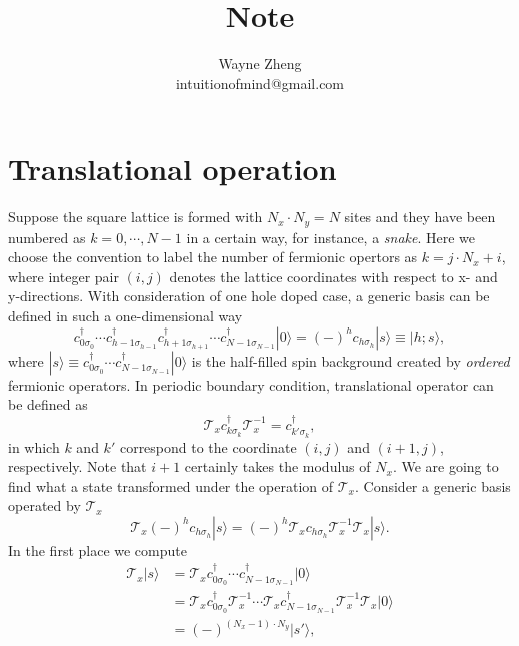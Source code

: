 \documentclass[eprint]{article} %
\begin{document}
\title{Note}
\author{Wayne Zheng \\
intuitionofmind@gmail.com}

\maketitle

\section{Translational operation}
Suppose the square lattice is formed with $N_{x}\cdot{N}_{y}=N$ sites and they have been numbered as $k=0, \cdots, N-1$ in a certain way, for instance, a \emph{snake}. Here we choose the convention to label the number of fermionic opertors as $k=j\cdot{N_{x}}+i$, where integer pair $(i, j)$ denotes the lattice coordinates with respect to x- and y-directions. With consideration of one hole doped case, a generic basis can be defined in such a one-dimensional way
\begin{equation}
    c_{0\sigma_{0}}^{\dagger}\cdots{c}_{h-1\sigma_{h-1}}^{\dagger}c_{h+1\sigma_{h+1}}^{\dagger}\cdots{c}_{N-1\sigma_{N-1}}^{\dagger}|0\rangle=(-)^{h}c_{h\sigma_{h}}|s\rangle\equiv|h; s\rangle,
    \label{}
\end{equation}
where $|s\rangle\equiv{c}_{0\sigma_{0}}^{\dagger}\cdots{c}_{N-1\sigma_{N-1}}^{\dagger}|0\rangle$ is the half-filled spin background created by \emph{ordered} fermionic operators. In periodic boundary condition, translational operator can be defined as
\begin{equation}
    \mathcal{T}_{x}c_{k\sigma_{k}}^{\dagger}\mathcal{T}_{x}^{-1}=c_{k{'}\sigma_{k}}^{\dagger},
    \label{}
\end{equation}
in which $k$ and $k{'}$ correspond to the coordinate $(i, j)$ and $(i+1, j)$, respectively. Note that $i+1$ certainly takes the modulus of $N_{x}$. We are going to find what a state transformed under the operation of $\mathcal{T}_{x}$. Consider a generic basis operated by $\mathcal{T}_{x}$
\begin{equation}
    \mathcal{T}_{x}(-)^{h}c_{h\sigma_{h}}|s\rangle=(-)^{h}\mathcal{T}_{x}c_{h\sigma_{h}}\mathcal{T}_{x}^{-1}\mathcal{T}_{x}|s\rangle.
    \label{<+label+>}
\end{equation}
In the first place we compute
\begin{equation}
    \begin{aligned}    
    \mathcal{T}_{x}|s\rangle&=\mathcal{T}_{x}c_{0\sigma_{0}}^{\dagger}\cdots{c}_{N-1\sigma_{N-1}}^{\dagger}|0\rangle \\
    &=\mathcal{T}_{x}c_{0\sigma_{0}}^{\dagger}\mathcal{T}_{x}^{-1}\cdots\mathcal{T}_{x}{c}_{N-1\sigma_{N-1}}^{\dagger}\mathcal{T}_{x}^{-1}\mathcal{T}_{x}|0\rangle \\
    &=(-)^{(N_{x}-1)\cdot{N}_{y}}|s{'}\rangle,
    \end{aligned}
    \label{<+label+>}
\end{equation}
\end{document}
